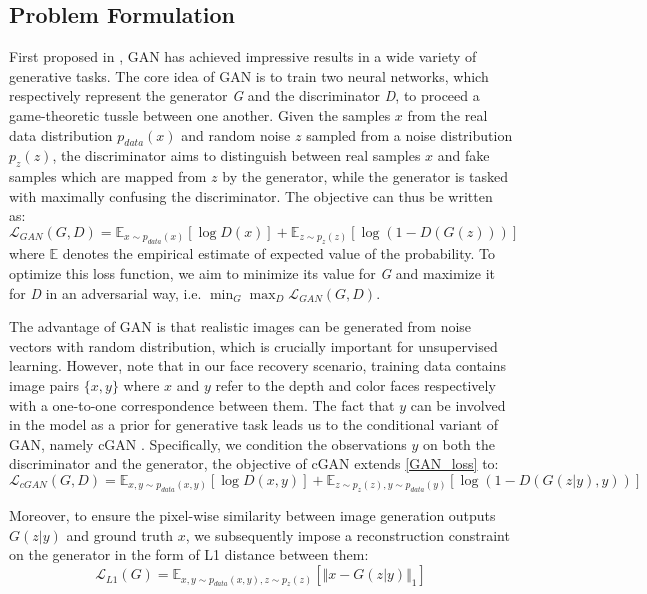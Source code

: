 \documentclass{bmvc2k}
\begin{document}
\subsection{Problem Formulation}
First proposed in \cite{goodfellow2014generative}, GAN has achieved impressive results in a wide variety of generative tasks. The core idea of GAN is to train two neural networks, which respectively represent the generator \textit{G} and the discriminator \textit{D}, to proceed a game-theoretic tussle between one another. Given the samples $x$ from the real data distribution $p_{data}(x)$ and random noise $z$ sampled from a noise distribution $p_{z}(z)$, the discriminator aims to distinguish between real samples $x$ and fake samples which are mapped from $z$ by the generator, while the generator is tasked with maximally confusing the discriminator. The objective can thus be written as:
\begin{equation}\label{GAN_loss}
\mathcal{L}_{GAN}(G,D) = \mathbb{E}_{x{\sim}p_{data}(x)}[\log D(x)] + \mathbb{E}_{z{\sim}p_{z}(z)}[\log (1-D(G(z)))]
\end{equation}
where $\mathbb{E}$ denotes the empirical estimate of expected value of the probability. To optimize this loss function, we aim to minimize its value for \textit{G} and maximize it for \textit{D} in an adversarial way, i.e. $\min_G \max_D \mathcal{L}_{GAN}(G,D)$. 

The advantage of GAN is that realistic images can be generated from noise vectors with random distribution, which is crucially important for unsupervised learning. However, note that in our face recovery scenario, training data contains image pairs $\{x,y\}$ where $x$ and $y$ refer to the depth and color faces respectively with a one-to-one correspondence between them. The fact that $y$ can be involved in the model as a prior for generative task leads us to the conditional variant of GAN, namely cGAN \cite{mirza2014conditional}. Specifically, we condition the observations $y$ on both the discriminator and the generator, the objective of cGAN extends \eqref{GAN_loss} to:
\begin{equation}\label{cGAN_loss}
\mathcal{L}_{cGAN}(G,D) = \mathbb{E}_{x,y{\sim}p_{data}(x,y)}[\log D(x,y)] + \mathbb{E}_{z{\sim}p_{z}(z), y{\sim}p_{data}(y)}[\log (1-D(G(z|y),y))]
\end{equation}

Moreover, to ensure the pixel-wise similarity between image generation outputs $G(z|y)$ and ground truth $x$, we subsequently impose a reconstruction constraint on the generator in the form of L1 distance between them:
\begin{equation}\label{L1_loss}
\mathcal{L}_{L1}(G) = \mathbb{E}_{x,y{\sim}p_{data}(x,y),z{\sim}p_{z}(z)}[\Vert x - G(z|y) \Vert_1]
\end{equation}
\end{document}
